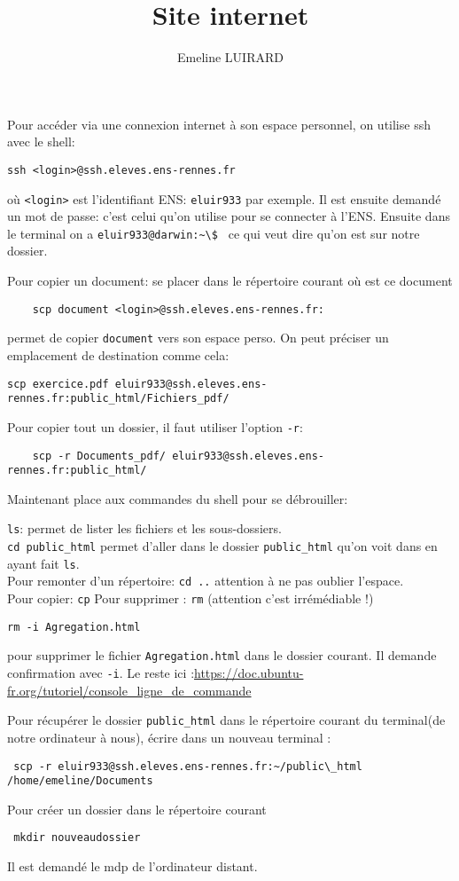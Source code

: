 \documentclass[12pt,a4paper]{article}
\title{Site internet}
\author{Emeline LUIRARD}
\theoremstyle {definition} \newtheorem {defi} {Définition} [section]
\theoremstyle{plain} \newtheorem {theo} {Théorème}[section]
\theoremstyle{remark} \newtheorem*{note}{Remarque}
\begin{document}
\maketitle	
Pour accéder via une connexion internet à son espace personnel, on utilise ssh avec le shell:
\begin{verbatim}
ssh <login>@ssh.eleves.ens-rennes.fr
\end{verbatim}

où \verb|<login>| est l'identifiant ENS: \verb|eluir933| par exemple.
Il est ensuite demandé un mot de passe: c'est celui qu'on utilise pour se connecter à l'ENS. 
Ensuite dans le terminal on a \verb|eluir933@darwin:~\$ | ce qui veut dire qu'on est sur notre dossier.

Pour copier un document: se placer dans le répertoire courant où est ce document
\begin{verbatim}
	scp document <login>@ssh.eleves.ens-rennes.fr:
\end{verbatim} permet de copier \verb|document| vers son espace perso. 
On peut préciser un emplacement de destination comme cela:
\begin{verbatim}
scp exercice.pdf eluir933@ssh.eleves.ens-rennes.fr:public_html/Fichiers_pdf/
\end{verbatim}
Pour copier tout un dossier, il faut utiliser l'option \verb|-r|:
\begin{verbatim}
	scp -r Documents_pdf/ eluir933@ssh.eleves.ens-rennes.fr:public_html/
\end{verbatim}

Maintenant place aux commandes du shell pour se débrouiller:

\verb|ls|: permet de lister les fichiers et les sous-dossiers.
\\ 
\verb|cd public_html| permet d'aller dans le dossier \verb|public_html| qu'on voit dans en ayant fait \verb|ls|.
\\ Pour remonter d'un répertoire: \verb|cd ..|  attention à ne pas oublier l'espace.
\\
Pour copier: \verb|cp|
Pour supprimer : \verb|rm|  (attention c'est irrémédiable !)
\begin{verbatim}
rm -i Agregation.html 
\end{verbatim}
pour supprimer le fichier \verb|Agregation.html| dans le dossier courant. Il demande confirmation avec \verb|-i|.
Le reste ici :\url{https://doc.ubuntu-fr.org/tutoriel/console_ligne_de_commande}

 Pour récupérer le dossier \verb|public_html| dans le répertoire courant du terminal(de notre ordinateur à nous), écrire dans un nouveau terminal :
 \begin{verbatim}
 scp -r eluir933@ssh.eleves.ens-rennes.fr:~/public\_html /home/emeline/Documents
 \end{verbatim}
 Pour créer un dossier dans le répertoire courant 
 \begin{verbatim}
 mkdir nouveaudossier
 \end{verbatim}

Il est demandé le mdp de l'ordinateur distant.
\end{document}
